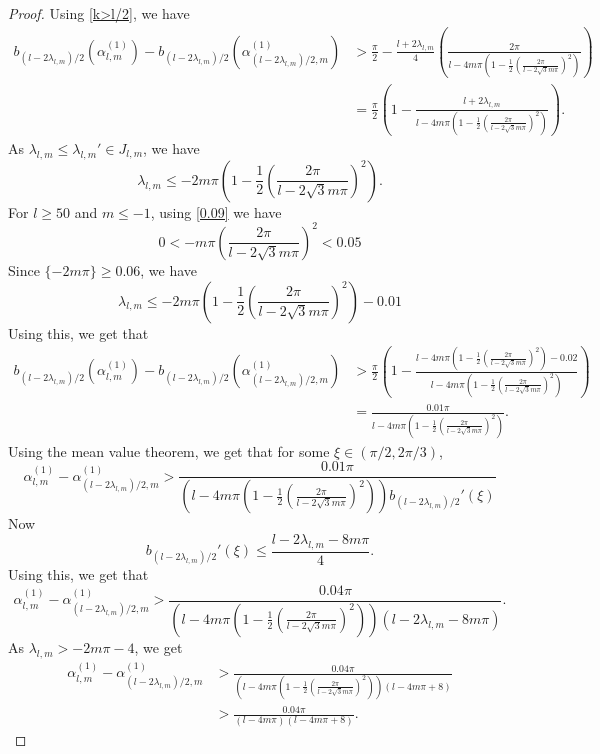 \documentclass[10pt,a4paper]{amsart}
\theoremstyle{plain}
\begin{document}
\begin{proof}
Using \eqref{k>l/2}, we have
\begin{align*}
b_{(l-2\lambda_{l,m})/2}(\alpha_{l,m}^{(1)})-b_{(l-2\lambda_{l,m})/2}(\alpha_{(l-2\lambda_{l,m})/2,m}^{(1)})&>\frac{\pi}{2}-
\frac{l+2\lambda_{l,m}}{4}\left(\frac{2\pi}{l-4m\pi\left(1-\frac{1}{2}\left(\frac{2\pi}{l-2\sqrt3m\pi}\right)^2\right)}\right)\\
&=\frac{\pi}{2}\left(1-\frac{l+2\lambda_{l,m}}{l-4m\pi\left(1-\frac{1}{2}\left(\frac{2\pi}{l-2\sqrt3m\pi}\right)^2\right)}\right).
\end{align*}
As $\lambda_{l,m}\le \lambda_{l,m}'\in J_{l,m}$, we have
\begin{equation}\label{0.005}
\lambda_{l,m}\le -2m\pi\left(1-\frac{1}{2}\left(\frac{2\pi}{l-2\sqrt3m\pi}\right)^2\right).
\end{equation}
For $l\ge 50$ and $m\le-1$, using \eqref{0.09} we have
$$
0<-m\pi\left(\frac{2\pi}{l-2\sqrt3m\pi}\right)^2<0.05
$$
Since $ \{-2m\pi\}\ge 0.06$, we have
$$
\lambda_{l,m}\le -2m\pi\left(1-\frac{1}{2}\left(\frac{2\pi}{l-2\sqrt3m\pi}\right)^2\right)-0.01
$$
Using this, we get that
\begin{align*}
b_{(l-2\lambda_{l,m})/2}(\alpha_{l,m}^{(1)})-b_{(l-2\lambda_{l,m})/2}(\alpha_{(l-2\lambda_{l,m})/2,m}^{(1)})&>\frac{\pi}{2}\left(1-\frac{l-4m\pi\left(1-\frac{1}{2}\left(\frac{2\pi}{l-2\sqrt3m\pi}\right)^2\right)-0.02}{l-4m\pi\left(1-\frac{1}{2}\left(\frac{2\pi}{l-2\sqrt3m\pi}\right)^2\right)}\right)\\
&=\frac{0.01\pi}{l-4m\pi\left(1-\frac{1}{2}\left(\frac{2\pi}{l-2\sqrt3m\pi}\right)^2\right)}.
\end{align*}
Using the mean value theorem, we get that for some $\xi\in (\pi/2,2\pi/3)$,
$$
\alpha_{l,m}^{(1)}-\alpha_{(l-2\lambda_{l,m})/2,m}^{(1)}>\frac{0.01\pi}{\left(l-4m\pi\left(1-\frac{1}{2}\left(\frac{2\pi}{l-2\sqrt3m\pi}\right)^2\right)\right)b_{(l-2\lambda_{l,m})/2}'(\xi)}
$$
Now 
$$
b_{(l-2\lambda_{l,m})/2}'(\xi)\le \frac{l-2\lambda_{l,m}-8m\pi}{4}.
$$
Using this, we get that
$$
\alpha_{l,m}^{(1)}-\alpha_{(l-2\lambda_{l,m})/2,m}^{(1)}>\frac{0.04\pi}{\left(l-4m\pi\left(1-\frac{1}{2}\left(\frac{2\pi}{l-2\sqrt3m\pi}\right)^2\right)\right)(l-2\lambda_{l,m}-8m\pi)}.
$$
As $\lambda_{l,m}>-2m\pi-4$, we get 
\begin{align*}
\alpha_{l,m}^{(1)}-\alpha_{(l-2\lambda_{l,m})/2,m}^{(1)}&>\frac{0.04\pi}{\left(l-4m\pi\left(1-\frac{1}{2}\left(\frac{2\pi}{l-2\sqrt3m\pi}\right)^2\right)\right)(l-4m\pi+8)}\\
&>\frac{0.04\pi}{(l-4m\pi)(l-4m\pi+8)}.
\end{align*}
\end{proof}
\end{document}
